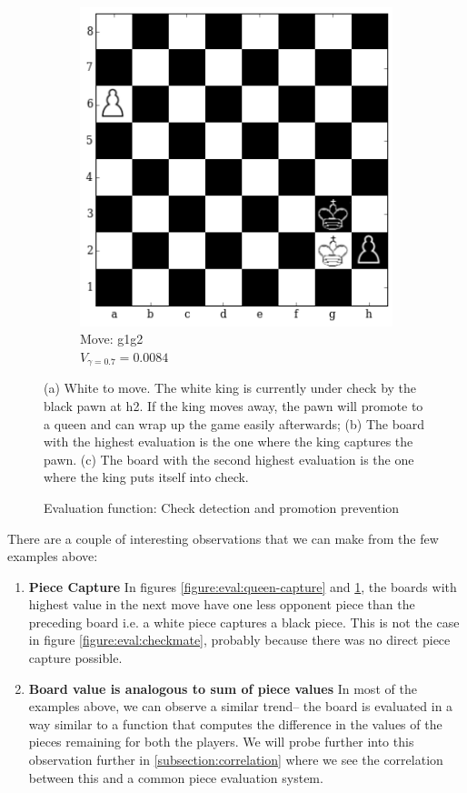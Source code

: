 \begin{figure}[H]
\begin{subfigure}[t]{0.45\textwidth}
    \includegraphics[width=\textwidth]{img/table_evaluations/output_15_4.png}
        \caption{Move: g1g2 \\
        $V_{\gamma=0.7}=0.0084$}
    \end{subfigure}
    \caption{Evaluation function: Check detection and promotion prevention}
    \small
    \justifying
    (a) White to move. The white king is currently under check by the black 
pawn at h2. If the king moves away, the pawn will promote to a queen and can 
wrap up the game easily afterwards; (b) The board with the highest evaluation 
is the one where the king captures the pawn. (c) The board with the second 
highest evaluation is the one where the king puts itself into check.
\label{figure:eval:check-promotion}
\end{figure}

There are a couple of interesting observations that we can make from the few 
examples above:
\begin{enumerate}
 \item \textbf{Piece Capture}
 In figures \ref{figure:eval:queen-capture} and 
\ref{figure:eval:check-promotion}, the boards with highest value in the next 
move have one less opponent piece than the preceding board i.e. a white piece 
captures a black piece. This is not the case in figure 
\ref{figure:eval:checkmate}, probably because there was no direct piece capture 
possible.
 \item \textbf{Board value is analogous to sum of piece values} In most of the 
examples above, %
we can observe a similar trend-- the board is evaluated in a way similar to a 
function that computes the difference in the values of the pieces remaining for 
both the players. We will probe further into this observation further in 
\ref{subsection:correlation} where we see the correlation between this and a 
common piece evaluation system.
\end{enumerate}

